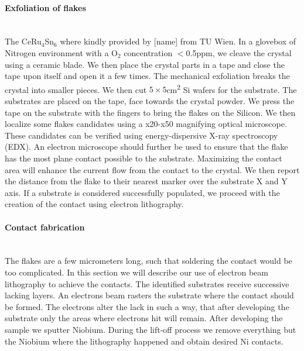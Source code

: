 \documentclass[../main.tex]{subfiles}
\begin{document}
    \paragraph{Exfoliation of flakes} $~$\\
    The CeRu$_4$Sn$_6$ where kindly provided by [name] from TU Wien. In a glovebox of Nitrogen environment with a O$_2$ concentration $<$0.5ppm, we cleave the 
    crystal using a ceramic blade. We then place the crystal parts in a tape and close the tape upon itself and open it a few times. The mechanical exfoliation breaks the crystal
    into smaller pieces. We then cut $5\times5$\si{\square\centi\meter}
    Si wafers for the substrate. The substrates are placed on the tape, face towards the crystal powder. We press the tape on the substrate with the fingers to bring the flakes on the Silicon.
    We then localize some flakes candidates using a x20-x50 magnifying optical microscope. These candidates can be verified using energy-dispersive X-ray spectroscopy (EDX). An electron microscope should 
    further be used to ensure that the flake has the most plane contact possible to the substrate. Maximizing the contact area will enhance the current flow from the contact to the crystal.
    We then report the distance from the flake to their nearest marker over the substrate X and Y axis. 
    If a substrate is considered successfully populated, we proceed with the creation of the contact using electron lithography.

    \begin{figure}[H]
        \centering
      
      \hspace*{48pt}
        
              
        
        \hspace*{48pt}
        
        \caption{}
        \label{}
    \end{figure}

    \paragraph{Contact fabrication} $~$\\
    The flakes are a few micrometers long, such that soldering the contact would be too complicated. In this section we will describe our use of electron beam lithography to achieve the contacts.
    The identified substrates receive successive lacking layers.
    An electrons beam rasters the substrate where the contact should be formed. The electrons alter the lack in such a way, that after developing the substrate only the areas 
    where electrons hit will remain. After developing the sample we sputter Niobium. During the lift-off process we remove everything but the Niobium where the lithography happened and obtain 
    desired Ni contacts.\\
\end{document}
